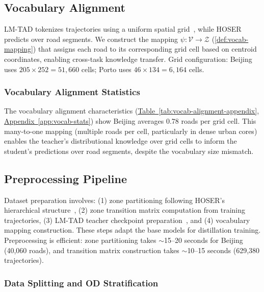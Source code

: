 \subsection{Vocabulary Alignment}
\label{sec:data-lmtad-compat}

LM-TAD tokenizes trajectories using a uniform spatial grid~\cite{mbuyaTrajectoryAnomalyDetection2024}, while HOSER predicts over road segments. We construct the mapping $\psi: \mathcal{V} \rightarrow \mathcal{Z}$ (\autoref{def:vocab-mapping}) that assigns each road to its corresponding grid cell based on centroid coordinates, enabling cross-task knowledge transfer. Grid configuration: Beijing uses $205 \times 252 = 51{,}660$ cells; Porto uses $46 \times 134 = 6{,}164$ cells.

\subsubsection{Vocabulary Alignment Statistics}

The vocabulary alignment characteristics (\hyperref[app:vocab-stats]{Table~\ref*{tab:vocab-alignment-appendix}, Appendix~\ref*{app:vocab-stats}}) show Beijing averages 0.78 roads per grid cell. This many-to-one mapping (multiple roads per cell, particularly in dense urban cores) enables the teacher's distributional knowledge over grid cells to inform the student's predictions over road segments, despite the vocabulary size mismatch.

\subsection{Preprocessing Pipeline}
\label{sec:data-pipeline}

Dataset preparation involves: (1) zone partitioning following HOSER's hierarchical structure~\cite{caoHolisticSemanticRepresentation2025}, (2) zone transition matrix computation from training trajectories, (3) LM-TAD teacher checkpoint preparation~\cite{mbuyaTrajectoryAnomalyDetection2024}, and (4) vocabulary mapping construction. These steps adapt the base models for distillation training. Preprocessing is efficient: zone partitioning takes $\sim$15--20 seconds for Beijing (40,060 roads), and transition matrix construction takes $\sim$10--15 seconds (629,380 trajectories).

\subsubsection{Data Splitting and OD Stratification}

